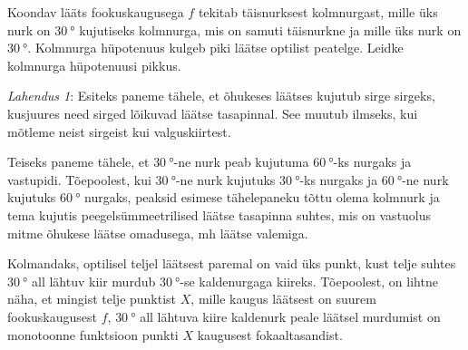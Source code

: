 
Koondav lääts fookuskaugusega $f$ tekitab täisnurksest kolmnurgast, mille üks nurk on $\SI{30}{\degree}$ kujutiseks kolmnurga, mis on samuti täisnurkne ja mille üks nurk on  $\SI{30}{\degree}$. Kolmnurga hüpotenuus kulgeb piki läätse optilist peatelge. Leidke kolmnurga hüpotenuusi pikkus.


\hint

\solu
\textit{Lahendus 1}:
Esiteks paneme tähele, et õhukeses läätses kujutub sirge sirgeks, kusjuures need sirged lõikuvad läätse tasapinnal. See muutub ilmseks, kui mõtleme neist sirgeist kui valguskiirtest.

Teiseks paneme tähele, et $\SI{30}{\degree}$-ne nurk peab kujutuma  $\SI{60}\degree$-ks nurgaks ja vastupidi. Tõepoolest, kui  $\SI{30}\degree$-ne nurk kujutuks  $\SI{30}\degree$-ks nurgaks ja  $\SI{60}\degree$-ne nurk kujutuks  $\SI{60}\degree$ nurgaks, peaksid esimese tähelepaneku tõttu olema kolmnurk ja tema kujutis peegelsümmeetrilised läätse tasapinna suhtes, mis on vastuolus mitme õhukese läätse omadusega, mh läätse valemiga.

Kolmandaks, optilisel teljel läätsest paremal on vaid üks punkt, kust telje suhtes $\SI{30}\degree$ all lähtuv kiir murdub  $\SI{30}\degree$-se kaldenurgaga kiireks. Tõepoolest, on lihtne näha, et mingist telje punktist $X$, mille kaugus läätsest on suurem fookuskaugusest $f$, $\SI{30}\degree$  all lähtuva kiire kaldenurk peale läätsel murdumist on monotoonne funktsioon punkti $X$ kaugusest fokaaltasandist.

